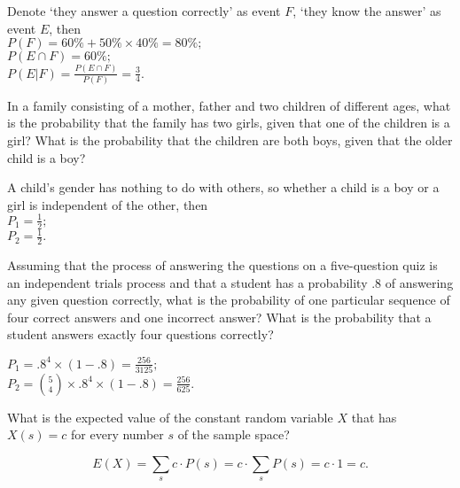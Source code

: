 \documentclass[12pt, a4paper, UTF8]{ctexart}
\begin{document}
\begin{solution}
  Denote `they answer a question correctly' as event $F$, `they know the answer' 
  as event $E$, then\\
  $P(F) = 60\% + 50\% \times 40\% = 80\%;$\\
  $P(E \cap F) = 60\%;$\\
  $P(E | F) = \frac{P(E \cap F)}{P(F)} = \frac{3}{4}.$
\end{solution}

\begin{problem}[CS: 5.3.12]
  In a family consisting of a mother, father and two children of different ages, 
  what is the probability that the family has two girls, given that one of the 
  children is a girl? What is the probability that the children are both boys, 
  given that the older child is a boy?
\end{problem}

\begin{solution}
  A child's gender has nothing to do with others, so whether a child is a boy 
  or a girl is independent of the other, then\\
  $P_{1} = \frac{1}{2};$\\
  $P_{2} = \frac{1}{2}.$
\end{solution}

\begin{problem}[CS: 5.4.4]
  Assuming that the process of answering the questions on a five-question quiz 
  is an independent trials process and that a student has a probability $.8$ 
  of answering any given question correctly, what is the probability of one 
  particular sequence of four correct answers and one incorrect answer? What 
  is the probability that a student answers exactly four questions correctly?
\end{problem}

\begin{solution}
  $P_{1} = .8^{4} \times (1 - .8) = \frac{256}{3125};$\\
  $P_{2} = \binom{5}{4} \times .8^{4} \times (1 - .8) = \frac{256}{625}.$
\end{solution}

\begin{problem}[CS: 5.4.10]
  What is the expected value of the constant random variable $X$ that has 
  $X(s) = c$ for every number $s$ of the sample space?
\end{problem}

\begin{solution}
  \[E(X) = \sum_{s} c\cdot P(s) = c\cdot \sum_{s} P(s) = c \cdot 1 = c.\]
\end{solution}
\end{document}
